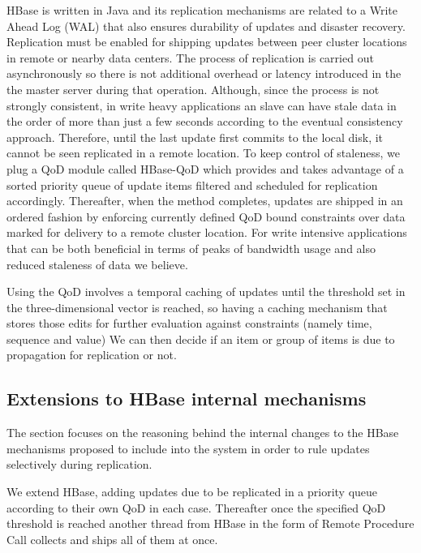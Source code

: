HBase is written in Java and its replication mechanisms are related to a Write Ahead Log (WAL) that also ensures durability of updates and disaster recovery. Replication must be enabled for shipping updates between peer cluster locations in remote or nearby data centers. The process of replication is carried out asynchronously so there is not additional overhead or latency introduced in the the master server during that operation.  Although, since the process is not strongly consistent, in write heavy applications an slave can have stale data in the order of more than just a few seconds according to the eventual consistency approach. Therefore, until the last update first commits to the local disk, it cannot be seen replicated in a remote location. To keep control of staleness, we plug a QoD module called HBase-QoD which provides and takes advantage of a sorted priority queue of update items filtered and scheduled for replication accordingly. Thereafter, when the method completes, updates are shipped in an ordered fashion by enforcing currently defined QoD bound constraints over data marked for delivery to a remote cluster location. For write intensive applications that can be both beneficial in terms of peaks of bandwidth usage and also reduced staleness of data we believe.


Using the QoD involves a temporal caching of updates until the threshold set in the three-dimensional vector is reached, so having a caching mechanism that stores those edits for further evaluation against constraints (namely time, sequence and value) We can then decide if an item or group of items is due to propagation for replication or not.

\subsection{Extensions to HBase internal mechanisms}\label{architecture:extensions}
The section focuses on the reasoning behind the internal changes to the HBase mechanisms proposed to include into the system in order to rule updates selectively during replication.

We extend HBase, adding updates due to be replicated in a priority queue according to their own QoD in each case. Thereafter once the specified QoD threshold is reached another thread from HBase in the form of Remote Procedure Call collects and ships all of them at once.

